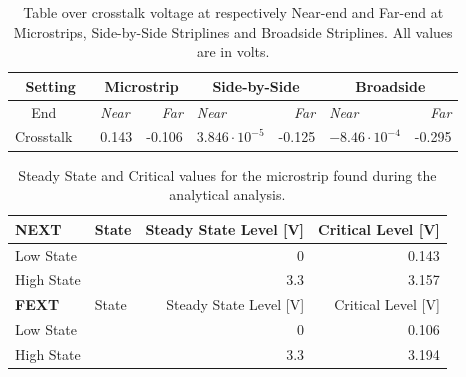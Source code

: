 \documentclass[../main.tex]{subfiles}
\begin{document}
\begin{table}[h]
    \centering
    \begin{tabular}{cl|lr|lr|lr}
    \toprule[1pt]
    \multicolumn{2}{c|}{\textbf{Setting}}                                   & \multicolumn{2}{c|}{\textbf{Microstrip}} & \multicolumn{2}{c|}{\textbf{\textbf{Side-by-Side}}} & \multicolumn{2}{c}{\textbf{Broadside}}  \\ \midrule
    End                       &                                    & \textit{Near} & \textit{Far}             & \textit{Near}     & \textit{Far}                    & \textit{Near}            & \textit{Far}   \\   \midrule
    Crosstalk                 &                                    & 0.143      & -0.106                      & $3.846 \cdot 10^{-5}$ & -0.125                      & $-8.46\cdot 10^{-4}$     & -0.295       \\
    \end{tabular}
    \caption{Table over crosstalk voltage at respectively Near-end and Far-end at Microstrips, Side-by-Side Striplines and Broadside Striplines. All values are in volts.}
\label{tab:crosstalk_results}
\end{table}

\begin{table}[h]
    \centering
    \begin{tabular}{l l|r r}
        \toprule[1pt]
        \textbf{NEXT} & State & Steady State Level [V] & Critical Level [V] \\
        \midrule
        Low State &  & 0 & 0.143\\
        High State &  & 3.3 & 3.157\\
        \midrule[1pt]
        \textbf{FEXT} & State & Steady State Level [V] & Critical Level [V] \\
        \midrule
        Low State & & 0 & 0.106\\
        High State & & 3.3 & 3.194\\
        \bottomrule[1pt]
    \end{tabular}
    \caption{Steady State and Critical values for the microstrip found during the analytical analysis.}
    \label{tab:analytical-microstrip}
\end{table}

\newpage
\end{document}
